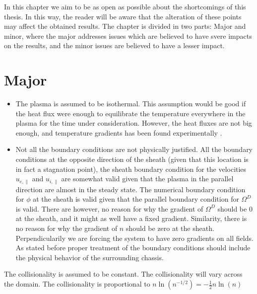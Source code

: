 In this chapter we aim to be as open as possible about the shortcomings of this thesis.
In this way, the reader will be aware that the alteration of these points may affect the obtained results.
The chapter is divided in two parts: Major and minor, where the major addresses issues which are believed to have svere impacts on the results, and the minor issues are believed to have a lesser impact.

\section{Major}
\begin{itemize}[noitemsep,nolistsep]
    \item The plasma is assumed to be isothermal.
        This assumption would be good if the heat flux were enough to equilibrate the temperature everywhere in the plasma for the time under consideration.
        However, the heat fluxes are not big enough, and temperature gradients has been found experimentally \cite{Schroder2003Phd}.
    \item Not all the boundary conditions are not physically justified.
        All the boundary conditions at the opposite direction of the sheath (given that this location is in fact a stagnation point), the sheath boundary condition for the velocities $u_{e,\|}$ and $u_{i,\|}$ are somewhat valid given that the plasma in the parallel direction are almost in the steady state.
        The numerical boundary condition for $\phi$ at the sheath is valid given that the parallel boundary condition for $\Omega^D$ is valid.
        There are however, no reason for why the gradient of $\Omega^D$ should be $0$ at the sheath, and it might as well have a fixed gradient.
        Similarity, there is no reason for why the gradient of $n$ should be zero at the sheath.
        Perpendicularily we are forcing the system to have zero gradients on all fields.
        As stated before proper treatment of the boundary conditions should include the physical behavior of the surrounding chassis.
\end{itemize}



The collisionality is assumed to be constant.
The collisionality will vary across the domain.
The collisionality is proportional to $n\ln(n^{-1/2})=-\frac{1}{2}n\ln(n)$

